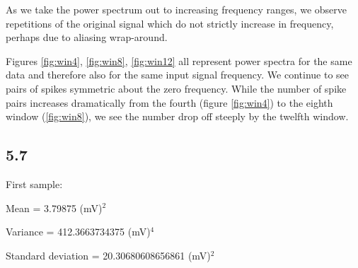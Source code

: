 \documentclass[a4paper]{article}
\begin{document}
As we take the power spectrum out to increasing frequency ranges, we observe repetitions of the original signal which do not strictly increase in frequency, perhaps due to aliasing wrap-around.

Figures \ref{fig:win4}, \ref{fig:win8}, \ref{fig:win12} all represent power spectra for the same data and therefore also for the same input signal frequency. We continue to see pairs of spikes symmetric about the zero frequency. While the number of spike pairs increases dramatically from the fourth (figure \ref{fig:win4}) to the eighth window (\ref{fig:win8}), we see the number drop off steeply by the twelfth window. %


\subsection{5.7}

First sample:

Mean = 3.79875 (mV)$^2$

Variance = 412.3663734375 (mV)$^4$

Standard deviation = 20.30680608656861 (mV)$^2$
\end{document}
